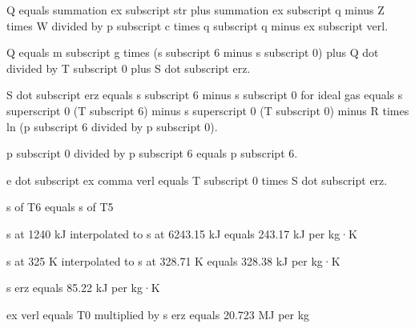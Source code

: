Q equals summation ex subscript str plus summation ex subscript q minus Z times W divided by p subscript c times q subscript q minus ex subscript verl.  

Q equals m subscript g times (s subscript 6 minus s subscript 0) plus Q dot divided by T subscript 0 plus S dot subscript erz.  

S dot subscript erz equals s subscript 6 minus s subscript 0 for ideal gas equals s superscript 0 (T subscript 6) minus s superscript 0 (T subscript 0) minus R times ln (p subscript 6 divided by p subscript 0).  

p subscript 0 divided by p subscript 6 equals p subscript 6.  

e dot subscript ex comma verl equals T subscript 0 times S dot subscript erz.

s of T6 equals s of T5  

s at 1240 kJ interpolated to s at 6243.15 kJ equals 243.17 kJ per kg·K  

s at 325 K interpolated to s at 328.71 K equals 328.38 kJ per kg·K  

s erz equals 85.22 kJ per kg·K  

ex verl equals T0 multiplied by s erz equals 20.723 MJ per kg